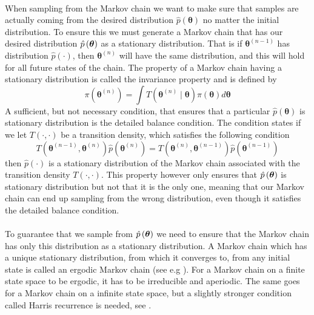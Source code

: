 \\
When sampling from the Markov chain we want to make sure that samples are actually coming from the desired distribution $\hat{p}(\boldsymbol{\theta})$ no matter the initial distribution. To ensure this we must generate a Markov chain that has our desired distribution  $\hat{p}\left (\boldsymbol{\theta}\right)$ as a stationary distribution. That is if $\boldsymbol{\theta}^{(n-1)}$ has distribution $\hat{p}(\cdot)$, then  $\boldsymbol{\theta}^{(n)}$ will have the same distribution, and this will hold for all future states of the chain. The property of a Markov chain having a stationary distribution is called the invariance property and is defined by
\begin{equation*}
    \pi(\boldsymbol{\theta}^{(n)})=\int T(\boldsymbol{\theta}^{(n)}\mid \boldsymbol{\theta}) \pi(\boldsymbol{\theta})d\boldsymbol{\theta}
\end{equation*}
A sufficient, but not necessary condition, that ensures that a particular $\hat{p}(\boldsymbol{\theta})$ is stationary distribution is the detailed balance condition. The condition states if we let $T(\cdot,\cdot)$ be a transition density, which satisfies the following condition 
$$T(\boldsymbol{\theta}^{(n-1)}, \boldsymbol{\theta}^{(n)}) \hat{p}(\boldsymbol{\theta}^{(n)})= T(\boldsymbol{\theta}^{(n)}, \boldsymbol{\theta}^{(n-1)})\hat{p}(\boldsymbol{\theta}^{(n-1)})$$
then $\hat{p}(\cdot)$ is a stationary distribution of the Markov chain associated with the transition density $T(\cdot,\cdot)$. This property however only ensures that $\hat{p}\left (\boldsymbol{\theta}\right)$ is stationary distribution but not that it is the only one, meaning that our Markov chain can end up sampling from the wrong distribution, even though it satisfies the detailed balance condition.
\\
\\
To guarantee that we sample from $\hat{p} \left (\boldsymbol{\theta}\right)$ we need to ensure that the Markov chain has only this distribution as a stationary distribution. A Markov chain which has a unique stationary distribution, from which it converges to, from any initial state is called an ergodic Markov chain (see e.g \cite{turkman2019computational}). For a Markov chain on a finite state space to be ergodic, it has to be irreducible and aperiodic. The same goes for a Markov chain on a infinite state space, but a slightly stronger condition called Harris recurrence is needed, see \cite{gamerman2006markov}.                                   
\\
\\

